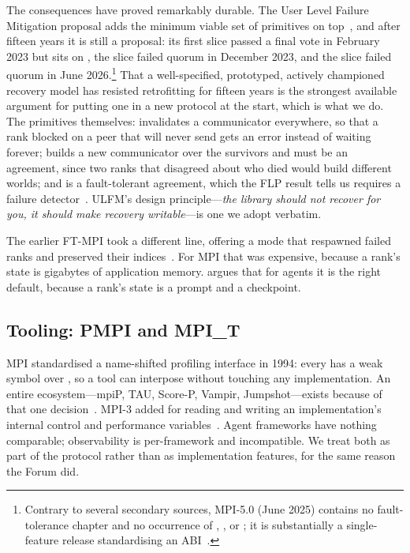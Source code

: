 The consequences have proved remarkably durable. The User Level Failure
Mitigation proposal adds the minimum viable set of primitives on
top~\cite{bland2012ulfm,Bland2013a}, and after fifteen years it is still a
proposal: its first slice passed a final vote in February 2023 but sits on
, the  slice failed quorum in December
2023, and the  slice failed quorum in June
2026.\footnote{Contrary to several secondary sources, MPI-5.0 (June 2025)
contains no fault-tolerance chapter and no occurrence of ,
,  or ; it is
substantially a single-feature release standardising an
ABI~\cite{mpi-forum-1994}.} That a well-specified, prototyped, actively
championed recovery model has resisted retrofitting for fifteen years is the
strongest available argument for putting one in a new protocol at the start,
which is what we do. The primitives themselves:  invalidates a
communicator everywhere, so that a rank blocked on a peer that will never
send gets an error instead of waiting forever;  builds a
new communicator over the survivors and must be an agreement, since two
ranks that disagreed about who died would build different worlds; and
 is a fault-tolerant agreement, which the FLP result tells
us requires a failure detector~\cite{Fischer1985}. ULFM's
design principle---\emph{the library should not recover for you, it should
make recovery writable}---is one we adopt verbatim.

The earlier FT-MPI took a different line, offering a  mode
that respawned failed ranks and preserved their
indices~\cite{Fagg2000}. For MPI that was expensive, because a rank's state
is gigabytes of application memory.  argues that for agents it
is the right default, because a rank's state is a prompt and a checkpoint.

\subsection{Tooling: PMPI and MPI\_T}

MPI standardised a name-shifted profiling interface in 1994: every
 has a weak symbol over , so a tool can interpose
without touching any implementation. An entire ecosystem---mpiP, TAU,
Score-P, Vampir, Jumpshot---exists because of that one
decision~\cite{shende2006tau,knupfer2012scorep}. MPI-3 added  for
reading and writing an implementation's internal control and performance
variables~\cite{islam2016mpit}. Agent frameworks have nothing comparable;
observability is per-framework and incompatible. We treat both as part of
the protocol rather than as implementation features, for the same reason the
Forum did.

